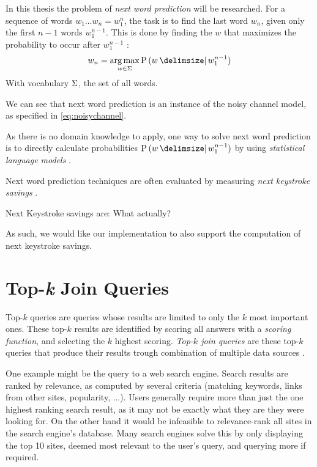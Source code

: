 In this thesis the problem of \emph{next word prediction} will be researched.
For a sequence of words $w_1 \ldots w_n = w_1^{n}$, the task is to find the last word
$w_n$, given only the first $n-1$ words $w_1^{n-1}$.
This is done by finding the $w$ that maximizes the probability to
occur after $w_1^{n-1}$ \parencite{Bickel2005}:
\begin{equation}
  \label{eq:nwp}
  w_n = \Argmax_{w \in \Vocab} \Prob{w}{w_1^{n-1}}
\end{equation}
With vocabulary $\Sigma$, the set of all words.

We can see that next word prediction is an instance of the noisy channel model,
as specified in \cref{eq:noisychannel}.

As there is no domain knowledge to apply, one way to solve next word prediction
is to directly calculate probabilities $\Prob{w}{w_1^{n-1}}$ by using
\emph{statistical language models} \parencite{Bickel2005}.

Next word prediction techniques are often evaluated by measuring \emph{next
keystroke savings} \parencite{Bickel2005}.
\begin{draft}Next Keystroke savings are: What actually?\end{draft}
As such, we would like our implementation to also support the computation of
next keystroke savings.

\section{Top-\emph{k} Join Queries}

Top-$k$ queries are queries whose results are limited to only the $k$ most
important ones.
These top-$k$ results are identified by scoring all answers with a
\emph{scoring function}, and selecting the $k$ highest scoring.
\emph{Top-$k$ join queries} are these top-$k$ queries that produce
their results trough combination of multiple data sources \parencite{Ilyas2008}.

One example might be the query to a web search engine.
Search results are ranked by relevance, as computed by several criteria
(matching keywords, links from other sites, popularity, ...).
Users generally require more than just the one highest ranking search result, as
it may not be exactly what they are they were looking for.
On the other hand it would be infeasible to relevance-rank all sites in the
search engine's database.
Many search engines solve this by only displaying the top 10 sites, deemed most
relevant to the user's query, and querying more if required.

